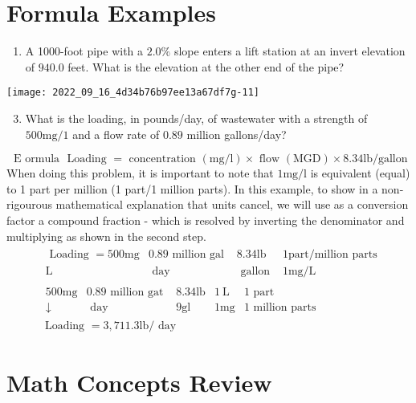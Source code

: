 \begin{enumerate}
\section{Formula Examples}
\begin{enumerate}
  \item A 1000-foot pipe with a $2.0 \%$ slope enters a lift station at an invert elevation of $940.0$ feet. What is the elevation at the other end of the pipe?
\end{enumerate}
\texttt{[image: 2022\_09\_16\_4d34b76b97ee13a67df7g-11]}

\begin{enumerate}
  \setcounter{enumi}{2}
  \item What is the loading, in pounds/day, of wastewater with a strength of $500 \mathrm{mg} / 1$ and a flow rate of $0.89$ million gallons/day?
\end{enumerate}
$$
\text { E ormula } \text { Loading }=\text { concentration }(\mathrm{mg} / \mathrm{l}) \times \text { flow }(\mathrm{MGD}) \times 8.34 \mathrm{lb} / \mathrm{gallon}
$$
When doing this problem, it is important to note that $1 \mathrm{mg} / \mathrm{l}$ is equivalent (equal) to 1 part per million (1 part/1 million parts). In this example, to show in a non-rigourous mathematical explanation that units cancel, we will use as a conversion factor a compound fraction - which is resolved by inverting the denominator and multiplying as shown in the second step.
$$
\begin{aligned}
& \begin{array}{c|c|c|c}\text { Loading }=500 \mathrm{mg} & 0.89 \text { million gal } & 8.34 \mathrm{lb} & 1 \mathrm{part} / \mathrm{million} \text { parts } \\\hline \mathrm{L} & \text { day } & \text { gallon } & 1 \mathrm{mg} / \mathrm{L}\end{array} \\
& \begin{array}{c|c|c|c|c}500 \mathrm{mg} & 0.89 \text { million gat } & 8.34 \mathrm{lb} & 1 \mathrm{~L} & 1 \text { part } \\\hline \downarrow & \text { day } & 9 \mathrm{gl} & 1 \mathrm{mg} & 1 \text { million parts }\end{array} \\
& \text { Loading }=3,711.3 \mathrm{lb} / \text { day } 
\end{aligned}
$$

\section{Math Concepts Review}

\end{enumerate}
